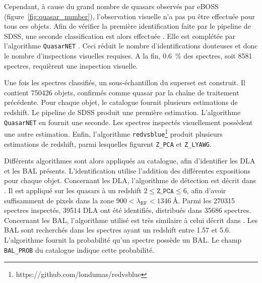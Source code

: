 Cependant, à cause du grand nombre de quasars observés par eBOSS (figure~\ref{fig:quasar_number}), l'observation visuelle n'a pas pu être effectuée pour tous ces objets.
Afin de vérifier la première identification faite par le pipeline de SDSS, une seconde classification est alors effectuée \autocite{Lyke2020}. Elle est complétée par l'algorithme \texttt{QuasarNET} \autocite{Busca2018}. Ceci réduit le nombre d'identifications douteuses et donc le nombre d'inspections visuelles requises. A la fin, \SI{0.6}{\percent} des spectres, soit \num{8581} spectres, requièrent une inspection visuelle.

Une fois les spectres classifiés, un sous-échantillon du superset est construit. Il contient \num{750426} objets, confirmés comme quasar par la chaîne de traitement précédente.
Pour chaque objet, le catalogue fournit plusieurs estimations de redshift. Le pipeline de SDSS produit une première estimation. L'algorithme \texttt{QuasarNET} en fournit une seconde. Les spectres inspectés visuellement possèdent une autre estimation. Enfin, l'algorithme \texttt{redvsblue}\footnote{https://github.com/londumas/redvsblue} produit plusieurs estimations de redshift, parmi lesquelles figurent \texttt{Z\_PCA} et \texttt{Z\_LYAWG}.

Différents algorithmes sont alors appliqués au catalogue, afin d'identifier les DLA et les BAL présents. L'identification utilise l'addition des différentes expositions pour chaque objet.
Concernant les DLA, l'algorithme de détection est décrit dans \textcite{Parks2017}. Il est appliqué sur les quasars à un redshift $2 \leq \texttt{Z\_PCA} \leq 6$, afin d'avoir suffisamment de pixels dans la zone $900 < \lambda_{\mathrm{RF}} < \SI{1346}{\angstrom}$. Parmi les \num{270315} spectres inspectés, \num{39514} DLA ont été identifiés, distribués dans \num{35686} spectres.
Concernant les BAL, l'algorithme utilisé est très similaire à celui décrit dans \textcite{Guo2019}. Les BAL sont recherchés dans les spectres ayant un redshift entre \num{1.57} et \num{5.6}. L'algorithme fournit la probabilité qu'un spectre possède un BAL. Le champ \texttt{BAL\_PROB} du catalogue indique cette probabilité.

